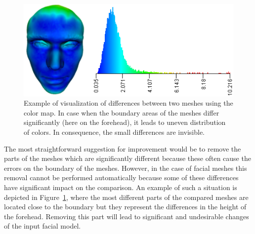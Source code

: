 \documentclass[final,5p,times]{elsarticle}
\begin{document}
\begin{figure}[htb]
	\centering
  \includegraphics[width=0.9\linewidth]{pictures/colormap.png}
  \caption{\label{fig:colormap} Example of visualization of differences between two meshes using the color map. In case when the boundary areas of the meshes differ significantly (here on the forehead), it leads to uneven distribution of colors. In consequence, the small differences are invisible.}
\end{figure}

The most straightforward suggestion for improvement would be to remove the parts of the meshes which are significantly different because these often cause the errors on the boundary of the meshes.
However, in the case of facial meshes this removal cannot be performed automatically because some of these differences have significant impact on the comparison.
An example of such a situation is depicted in Figure~\ref{fig:colormap}, where the most different parts of the compared meshes are located close to the boundary but they represent the differences in the height of the forehead.
Removing this part will lead to significant and undesirable changes of the input facial model.
\end{document}
